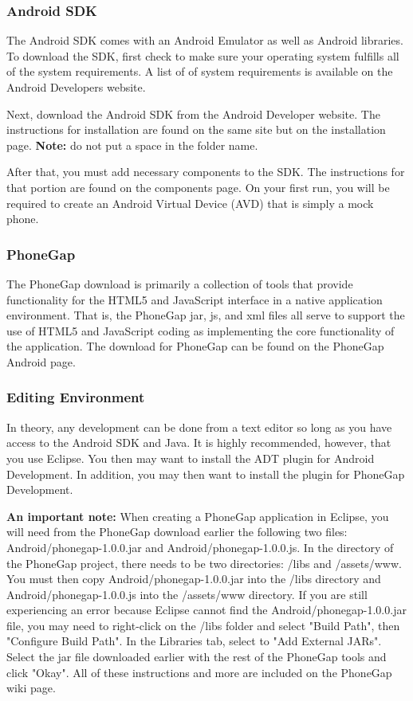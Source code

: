 \documentclass[12pt]{article}
\begin{document}
\subsubsection{Android SDK}
The Android SDK comes with an Android Emulator as well as Android libraries.
To download the SDK, first check to make sure your operating system fulfills all of the system requirements.  A list of of system requirements is available on the Android Developers website\cite{AndroidSDK-SystemRequirements}.

Next, download the Android SDK from the Android Developer website\cite{AndroidSDK-Download}.
The instructions for installation are found on the same site but on the installation page\cite{AndroidSDK-Installation}. \textbf{Note:} do not put a space in the folder name.

After that, you must add necessary components to the SDK.  The instructions for that portion are found on the components page\cite{AndroidSDK-Components}.  On your first run, you will be required to create an Android Virtual Device (AVD) that is simply a mock phone.


\subsubsection{PhoneGap}
The PhoneGap download is primarily a collection of tools that provide functionality for the HTML5 and JavaScript interface in a native application environment.  That is, the PhoneGap jar, js, and xml files all serve to support the use of HTML5 and JavaScript coding as implementing the core functionality of the application.  The download for PhoneGap can be found on the PhoneGap Android page\cite{PhoneGap-Android}.


\subsubsection{Editing Environment}
In theory, any development can be done from a text editor so long as you have access to the Android SDK and Java.  It is highly recommended, however, that you use Eclipse\cite{Eclipse-Helios}.  You then may want to install the ADT plugin for Android Development\cite{Eclipse-ADT}.  In addition, you may then want to install the plugin for PhoneGap Development\cite{PhoneGap-Eclipse}.

\textbf{An important note:} When creating a PhoneGap application in Eclipse, you will need from the PhoneGap download earlier the following two files: Android/phonegap-1.0.0.jar and Android/phonegap-1.0.0.js.  In the directory of the PhoneGap project, there needs to be two directories: /libs and /assets/www.  You must then copy Android/phonegap-1.0.0.jar into the /libs directory and Android/phonegap-1.0.0.js into the /assets/www directory.  If you are still experiencing an error because Eclipse cannot find the Android/phonegap-1.0.0.jar file, you may need to right-click on the /libs folder and select "Build Path", then "Configure Build Path".  In the Libraries tab, select to "Add External JARs".  Select the jar file downloaded earlier with the rest of the PhoneGap tools and click "Okay". All of these instructions and more are included on the PhoneGap wiki page\cite{Wiki-PhoneGap-Eclipse}.
\end{document}
